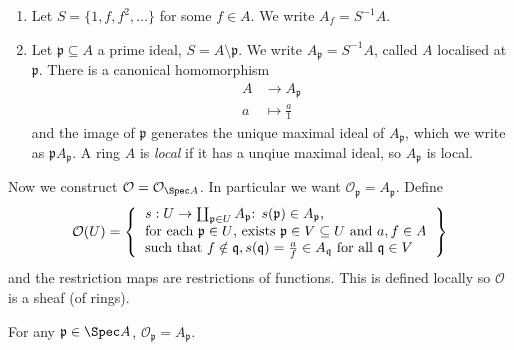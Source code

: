 \documentclass[a4paper]{article}
\newcommand{\sh}[1]{\mathcal{#1}} %
\begin{document}
\begin{eg}\leavevmode
  \begin{enumerate}
  \item Let \(S = \{1, f, f^2, \dots\}\) for some \(f \in A\). We write \(A_f = S^{-1}A\).
  \item Let \(\mathfrak p \subseteq A\) a prime ideal, \(S = A \setminus \mathfrak p\). We write \(A_{\mathfrak p} = S^{-1}A\), called \(A\) localised at \(\mathfrak p\). There is a canonical homomorphism
    \begin{align*}
      A &\to A_{\mathfrak p} \\
      a &\mapsto \frac{a}{1}
    \end{align*}
    and the image of \(\mathfrak p\) generates the unique maximal ideal of \(A_{\mathfrak p}\), which we write as \(\mathfrak p A_{\mathfrak p}\). A ring \(A\) is \emph{local} if it has a unqiue maximal ideal, so \(A_{\mathfrak p}\) is local.
  \end{enumerate}
\end{eg}

Now we construct \(\sh O = \mathcal O_{\Spec A}\). In particular we want \(\sh O_{\mathfrak p} = A_{\mathfrak p}\). Define
\[
  \sh O(U) =
  \left\{
    \begin{tabular}{l}
      \(s: U \to \coprod_{\mathfrak p \in U} A_{\mathfrak p}\): \(s(\mathfrak p) \in A_{\mathfrak p}\), \\
      for each \(\mathfrak p \in U\), exists \(\mathfrak p \in V \subseteq U\) and \(a, f \in A\) \\
      such that \(f \notin \mathfrak q, s(\mathfrak q) = \frac{a}{f} \in A_{\mathfrak q}\) for all \(\mathfrak q \in V\)
    \end{tabular}
  \right\}
\]
and the restriction maps are restrictions of functions. This is defined locally so \(\sh O\) is a sheaf (of rings).

\begin{proposition}
  For any \(\mathfrak p \in \Spec A\), \(\sh O_{\mathfrak p} = A_{\mathfrak p}\).
\end{proposition}
\end{document}
